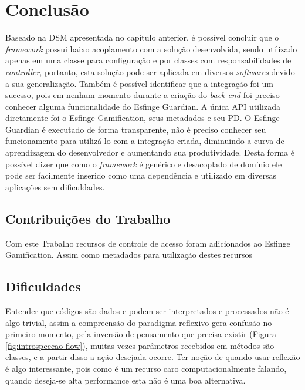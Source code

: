 \newpage
\chapter{Conclus\~ao}

\par Baseado na DSM apresentada no capítulo anterior, é possível concluir que o \textit{framework} possui baixo acoplamento com a solução desenvolvida, sendo utilizado apenas em uma classe para configuração e por classes com responsabilidades de \textit{controller}, portanto, esta solução pode ser aplicada em diversos \textit{softwares} devido a sua generalização. Também é possível identificar que a integração foi um sucesso, pois em nenhum momento durante a criação do \textit{back-end} foi preciso conhecer alguma funcionalidade do Esfinge Guardian. A única API utilizada diretamente foi o Esfinge Gamification, seus metadados e seu PD. O Esfinge Guardian é executado de forma transparente, não é preciso conhecer seu funcionamento para utilizá-lo com a integração criada, diminuindo a curva de aprendizagem do desenvolvedor e aumentando sua produtividade. Desta forma é possível dizer que como o \textit{framework} é genérico e desacoplado de domínio ele pode ser facilmente inserido como uma dependência e utilizado em diversas aplicações sem dificuldades.

\section{Contribuições do Trabalho}

\par Com este Trabalho recursos de controle de acesso foram adicionados ao Esfinge Gamification. Assim como metadados para utilização destes recursos

\section{Dificuldades}

\par Entender que códigos são dados e podem ser interpretados e processados não é algo trivial, assim a compreensão do paradigma reflexivo gera confusão no primeiro momento, pela inversão de pensamento que precisa existir (Figura \ref{fig:introspeccao-flow}), muitas vezes parâmetros recebidos em métodos são classes, e a partir disso a ação desejada ocorre. Ter noção de quando usar reflexão é algo interessante, pois como é um recurso caro computacionalmente falando, quando deseja-se alta performance esta não é uma boa alternativa.

